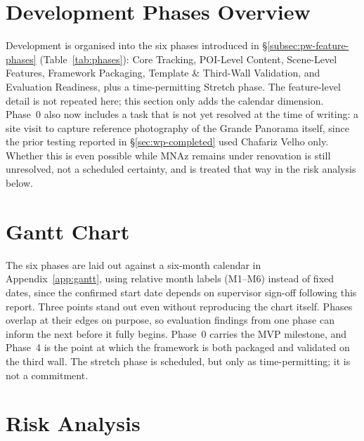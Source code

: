 \section{Development Phases Overview}
\label{sec:wp-overview}
 
Development is organised into the six phases introduced in
\S\ref{subsec:pw-feature-phases} (Table~\ref{tab:phases}): Core Tracking,
POI-Level Content, Scene-Level Features, Framework Packaging, Template
\& Third-Wall Validation, and Evaluation Readiness, plus a
time-permitting Stretch phase. The feature-level detail is not repeated
here; this section only adds the calendar dimension. Phase~0 also now
includes a task that is not yet resolved at the time of writing: a site
visit to capture reference photography of the Grande Panorama itself,
since the prior testing reported in \S\ref{sec:wp-completed} used
Chafariz Velho only. Whether this is even possible while MNAz remains
under renovation is still unresolved, not a scheduled certainty,
and is treated that way in the risk analysis below.
 
\section{Gantt Chart}
\label{sec:wp-gantt}
 
The six phases are laid out against a six-month calendar in
Appendix~\ref{app:gantt}, using relative month labels (M1--M6) instead
of fixed dates, since the confirmed start date depends on supervisor
sign-off following this report. Three points stand out even without
reproducing the chart itself. Phases overlap at
their edges on purpose, so evaluation findings from one phase can inform the next
before it fully begins. Phase~0 carries the MVP milestone, and Phase~4
is the point at which the framework is both packaged and validated on
the third wall. The stretch phase is scheduled, but only as
time-permitting; it is not a commitment.

\section{Risk Analysis}
\label{sec:wp-risks}

